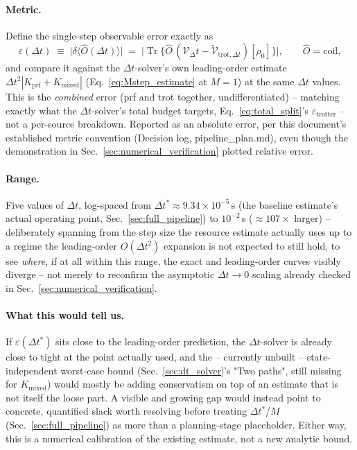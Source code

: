 \documentclass[11pt]{article}
\newcommand{\calV}{\mathcal{V}}
\newcommand{\Dt}{\Delta t}
\DeclareMathOperator{\Tr}{Tr}
\begin{document}
\paragraph{Metric.} Define the single-step observable error exactly as
\begin{equation}\label{eq:tightness_epsilon}
    \varepsilon(\Dt) \;\equiv\; \big|\delta\langle\hat O(\Dt)\rangle\big| \;=\; \big|\Tr\{\hat O\,(\calV_\Dt-\tilde{\calV}_{\text{trot},\Dt})[\rho_0]\}\big|,\qquad \hat O=\text{coil},
\end{equation}
and compare it against the $\Dt$-solver's own leading-order estimate $\Dt^2|K_{\text{prf}}+K_{\text{mixed}}|$ (Eq.~\eqref{eq:Mstep_estimate} at $M=1$) at the same $\Dt$ values. This is the \emph{combined} error (prf and trot together, undifferentiated) -- matching exactly what the $\Dt$-solver's total budget targets, Eq.~\eqref{eq:total_split}'s $\varepsilon_{\text{trotter}}$ -- not a per-source breakdown. Reported as an absolute error, per this document's established metric convention (Decision log, pipeline\_plan.md), even though the demonstration in Sec.~\ref{sec:numerical_verification} plotted relative error.

\paragraph{Range.} Five values of $\Dt$, log-spaced from $\Dt^\ast\approx9.34\times10^{-5}\,$s (the baseline estimate's actual operating point, Sec.~\ref{sec:full_pipeline}) to $10^{-2}\,$s ($\approx107\times$ larger) -- deliberately spanning from the step size the resource estimate actually uses up to a regime the leading-order $O(\Dt^2)$ expansion is not expected to still hold, to see \emph{where}, if at all within this range, the exact and leading-order curves visibly diverge -- not merely to reconfirm the asymptotic $\Dt\to0$ scaling already checked in Sec.~\ref{sec:numerical_verification}.

\paragraph{What this would tell us.} If $\varepsilon(\Dt^\ast)$ sits close to the leading-order prediction, the $\Dt$-solver is already close to tight at the point actually used, and the -- currently unbuilt -- state-independent worst-case bound (Sec.~\ref{sec:dt_solver}'s "Two paths", still missing for $K_{\text{mixed}}$) would mostly be adding conservatism on top of an estimate that is not itself the loose part. A visible and growing gap would instead point to concrete, quantified slack worth resolving before treating $\Dt^\ast$/$M$ (Sec.~\ref{sec:full_pipeline}) as more than a planning-stage placeholder. Either way, this is a numerical calibration of the existing estimate, not a new analytic bound.
\end{document}

